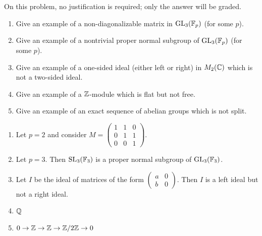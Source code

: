 \begin{question}[subtitle=August 2020 Problem 1,ID=Aug20_1]
On this problem, no justification is required; only the answer will be graded.
\begin{enumerate}
    \item Give an example of a non-diagonalizable matrix in $\operatorname{GL}_3(\mathbb{F}_p)$ (for some $p$).
    \item Give an example of a nontrivial proper normal subgroup of $\operatorname{GL}_3(\mathbb{F}_p)$ (for some $p$).
    \item Give an example of a one-sided ideal (either left or right) in $M_2(\mathbb{C})$ which is not a two-sided ideal.
    \item Give an example of a $\mathbb{Z}$-module which is flat but not free.
    \item Give an example of an exact sequence of abelian groups which is not split.
\end{enumerate}
\end{question}
\begin{solution}
\begin{enumerate}
    \item Let $p=2$ and consider $M = \begin{pmatrix} 1 & 1 & 0\\ 0 & 1 & 1 \\ 0 & 0 & 1\end{pmatrix}$.
    \item Let $p=3$. Then $\operatorname{SL}_3(\mathbb{F}_3)$ is a proper normal subgroup of $\operatorname{GL}_3(\mathbb{F}_3)$.
    \item Let $I$ be the ideal of matrices of the form $\begin{pmatrix} a & 0\\ b & 0\end{pmatrix}$. Then $I$ is a left ideal but not a right ideal.
    \item $\mathbb{Q}$
    \item $0 \to \mathbb{Z} \to \mathbb{Z} \to \mathbb{Z}/2\mathbb{Z} \to 0$
\end{enumerate}
\end{solution}


